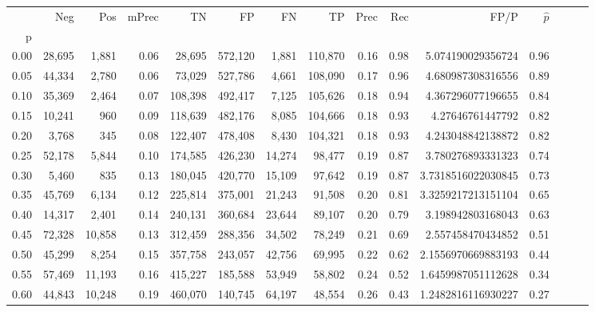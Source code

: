 \begin{tabular}{rrrrrrrrrrrrrrr}
\toprule
{} &     Neg &     Pos & mPrec &       TN &       FP &       FN &       TP &  Prec &   Rec &                FP/P & $\hat{p}$ \\
p    &         &         &       &          &          &          &          &       &       &                     &           \\
\midrule
0.00 &  28,695 &   1,881 &  0.06 &   28,695 &  572,120 &    1,881 &  110,870 &  0.16 &  0.98 &   5.074190029356724 &      0.96 \\
0.05 &  44,334 &   2,780 &  0.06 &   73,029 &  527,786 &    4,661 &  108,090 &  0.17 &  0.96 &   4.680987308316556 &      0.89 \\
0.10 &  35,369 &   2,464 &  0.07 &  108,398 &  492,417 &    7,125 &  105,626 &  0.18 &  0.94 &   4.367296077196655 &      0.84 \\
0.15 &  10,241 &     960 &  0.09 &  118,639 &  482,176 &    8,085 &  104,666 &  0.18 &  0.93 &    4.27646761447792 &      0.82 \\
0.20 &   3,768 &     345 &  0.08 &  122,407 &  478,408 &    8,430 &  104,321 &  0.18 &  0.93 &   4.243048842138872 &      0.82 \\
0.25 &  52,178 &   5,844 &  0.10 &  174,585 &  426,230 &   14,274 &   98,477 &  0.19 &  0.87 &   3.780276893331323 &      0.74 \\
0.30 &   5,460 &     835 &  0.13 &  180,045 &  420,770 &   15,109 &   97,642 &  0.19 &  0.87 &  3.7318516022030845 &      0.73 \\
0.35 &  45,769 &   6,134 &  0.12 &  225,814 &  375,001 &   21,243 &   91,508 &  0.20 &  0.81 &  3.3259217213151104 &      0.65 \\
0.40 &  14,317 &   2,401 &  0.14 &  240,131 &  360,684 &   23,644 &   89,107 &  0.20 &  0.79 &   3.198942803168043 &      0.63 \\
0.45 &  72,328 &  10,858 &  0.13 &  312,459 &  288,356 &   34,502 &   78,249 &  0.21 &  0.69 &   2.557458470434852 &      0.51 \\
0.50 &  45,299 &   8,254 &  0.15 &  357,758 &  243,057 &   42,756 &   69,995 &  0.22 &  0.62 &  2.1556970669883193 &      0.44 \\
0.55 &  57,469 &  11,193 &  0.16 &  415,227 &  185,588 &   53,949 &   58,802 &  0.24 &  0.52 &  1.6459987051112628 &      0.34 \\
0.60 &  44,843 &  10,248 &  0.19 &  460,070 &  140,745 &   64,197 &   48,554 &  0.26 &  0.43 &  1.2482816116930227 &      0.27 \\

\end{tabular}
